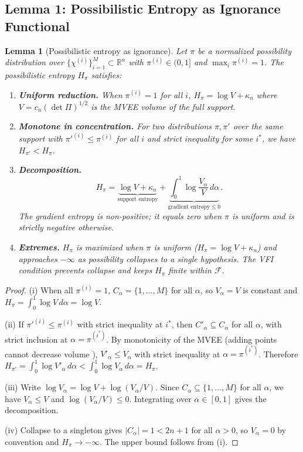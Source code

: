 \documentclass[12pt]{article}
\newtheorem{lemma}[theorem]{Lemma}
\begin{document}
\subsection{Lemma 1: Possibilistic Entropy as Ignorance Functional}

\begin{lemma}[Possibilistic entropy as ignorance]
Let $\pi$ be a normalized possibility distribution over
$\{\chi^{(i)}\}^M_{i=1} \subset \mathbb{R}^n$ with $\pi^{(i)} \in (0,1]$ and $\max_i \pi^{(i)} = 1$. The possibilistic entropy $H_\pi$ satisfies:
\begin{enumerate}
\item[(i)] \textbf{Uniform reduction.} When $\pi^{(i)} = 1$ for all $i$, $H_\pi = \log V + \kappa_n$ where $V = c_n(\det \Pi)^{1/2}$ is the MVEE volume of the full support.
\item[(ii)] \textbf{Monotone in concentration.} For two distributions $\pi, \pi'$ over the same support with $\pi'^{(i)} \leq \pi^{(i)}$ for all $i$ and strict inequality for some $i^*$, we have $H_{\pi'} < H_\pi$.
\item[(iii)] \textbf{Decomposition.}
\begin{equation}
H_\pi = \underbrace{\log V + \kappa_n}_{\text{support entropy}} + \underbrace{\int_0^1 \log\frac{V_\alpha}{V}\,d\alpha}_{\text{gradient entropy} \leq 0}.
\end{equation}
The gradient entropy is non-positive; it equals zero when $\pi$ is uniform and is strictly negative otherwise.
\item[(iv)] \textbf{Extremes.} $H_\pi$ is maximized when $\pi$ is uniform ($H_\pi = \log V + \kappa_n$) and approaches $-\infty$ as possibility collapses to a single hypothesis. The VFI condition prevents collapse and keeps $H_\pi$ finite within $\mathcal{F}$.
\end{enumerate}
\end{lemma}

\begin{proof}
(i) When all $\pi^{(i)} = 1$, $C_\alpha = \{1,\ldots,M\}$ for all $\alpha$, so $V_\alpha = V$ is constant and $H_\pi = \int_0^1 \log V\,d\alpha = \log V$.

(ii) If $\pi'^{(i)} \leq \pi^{(i)}$ with strict inequality at $i^*$, then $C'_\alpha \subseteq C_\alpha$ for all $\alpha$, with strict inclusion at $\alpha = \pi^{(i^*)}$. By monotonicity of the MVEE (adding points cannot decrease volume \cite{todd}), $V'_\alpha \leq V_\alpha$ with strict inequality at $\alpha = \pi^{(i^*)}$. Therefore $H_{\pi'} = \int_0^1 \log V'_\alpha\,d\alpha < \int_0^1 \log V_\alpha\,d\alpha = H_\pi$.

(iii) Write $\log V_\alpha = \log V + \log(V_\alpha/V)$. Since $C_\alpha \subseteq \{1,\ldots,M\}$ for all $\alpha$, we have $V_\alpha \leq V$ and $\log(V_\alpha/V) \leq 0$. Integrating over $\alpha \in [0,1]$ gives the decomposition.

(iv) Collapse to a singleton gives $|C_\alpha| = 1 < 2n+1$ for all $\alpha > 0$, so $V_\alpha = 0$ by convention and $H_\pi \to -\infty$. The upper bound follows from (i).
\end{proof}
\end{document}
